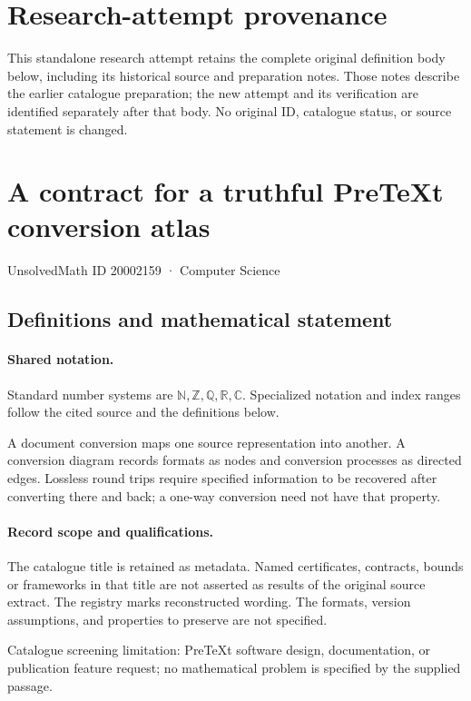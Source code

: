 \documentclass[11pt]{article}
\begin{document}
\section*{Research-attempt provenance}
This standalone research attempt retains the complete original definition body below,
including its historical source and preparation notes. Those notes describe the
earlier catalogue preparation; the new attempt and its verification are identified
separately after that body. No original ID, catalogue status, or source statement is changed.

\section{A contract for a truthful PreTeXt conversion atlas}\label{20002159}
{\small UnsolvedMath ID 20002159 · Computer Science}
\subsection{Definitions and mathematical statement}

\paragraph{Shared notation.}Standard number systems are $\mathbb N,\mathbb Z,\mathbb Q,\mathbb R,\mathbb C$. Specialized notation and index ranges follow the cited source and the definitions below.


A document conversion maps one source representation into another. A conversion diagram records formats as nodes and conversion processes as directed edges. Lossless round trips require specified information to be recovered after converting there and back; a one-way conversion need not have that property.
\paragraph{Record scope and qualifications.}
The catalogue title is retained as metadata. Named certificates, contracts, bounds or frameworks in that title are not asserted as results of the original source extract.
The registry marks reconstructed wording. The formats, version assumptions, and properties to preserve are not specified.

Catalogue screening limitation: PreTeXt software design, documentation, or publication feature request; no mathematical problem is specified by the supplied passage.
\end{document}
